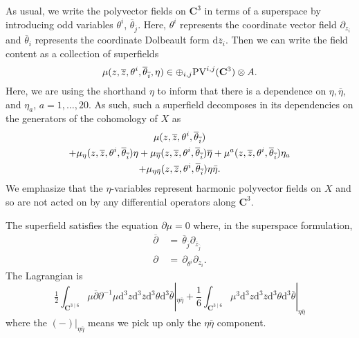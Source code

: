 \documentclass[11pt]{amsart}
\newcommand{\dbar}{\br{\partial}}
\newcommand{\zbar}{\br{z}}
\newcommand{\PV}{\op{PV}}
\newcommand{\br}{\overline}
\renewcommand{\d}{\mathrm{d}}
\def\zbar{{\overline{z}}}
\def\PV{{\rm PV}}
\newcommand{\op}{\operatorname}
\newcommand\C{\mathbf{C}}
\theoremstyle{thm}
\numberwithin{equation}{subsection}
\theoremstyle{def}
\theoremstyle{rem}
\begin{document}
As usual, we write the polyvector fields on $\C^3$ in terms of a superspace by introducing odd variables $\theta^i$, $\br{\theta}_{\br{j}}$.  
Here, $\theta^i$ represents the coordinate vector field $\partial_{z_i}$ and $\br \theta_i$ represents the coordinate Dolbeault form $\d \zbar_i$. 
Then we can write the field content as a collection of superfields
\begin{equation} 
		\mu(z,\zbar,\theta^i, \br{\theta}_{\br{i}},\eta) \in \oplus_{i,j}  \PV^{i,j}(\C^3) \otimes A .
\end{equation}
Here, we are using the shorthand $\eta$ to inform that there is a dependence on $\eta, \br{\eta}$, and $\eta_a$, $a=1,\ldots, 20$. 
As such, such a superfield decomposes in its dependencies on the generators of the cohomology of $X$ as
\begin{multline}
\mu(z,\zbar,\theta^i, \br{\theta}_{\br{i}}) \\
+ \mu_\eta (z,\zbar,\theta^i, \br{\theta}_{\br{i}}) \eta + \mu_{\br{\eta}} (z,\zbar,\theta^i, \br{\theta}_{\br{i}}) \br{\eta} + \mu^a (z,\zbar,\theta^i, \br{\theta}_{\br{i}}) \eta_a \\
+ \mu_{\eta \Bar{\eta}} (z,\zbar,\theta^i, \br{\theta}_{\br{i}}) \eta \Bar{\eta} .
\end{multline}
We emphasize that the $\eta$-variables represent harmonic polyvector fields on $X$ and so are not acted on by any differential operators along $\C^3$. 

The superfield satisfies the equation $\partial \mu = 0$
where, in the superspace formulation,
\begin{align} 
	\dbar & \, = \, \br{\theta}_{\br{j}} \partial_{\zbar_{\br{j}}} \\
	\partial &\, = \, \partial_{\theta^i} \partial_{z_i}.  
\end{align}
	The Lagrangian is
	\begin{equation} 
		\tfrac{1}{2} \int_{\C^{3 \mid 6}}  \mu \dbar \partial^{-1} \mu \d^3 z \d^3 \zbar \d^3 \theta \d^3 \br{\theta} |_{\eta \br{\eta}} + \frac{1}{6} \int_{\C^{3 \mid 6}} \mu^3 \d^3 z \d^3 \zbar \d^3 \theta \d^3 \br{\theta} |_{\eta \br{\eta}}  
	\end{equation}
where the $(-)|_{\eta \br{\eta}}$ means we pick up only the $\eta \br{\eta}$ component.
\end{document}
